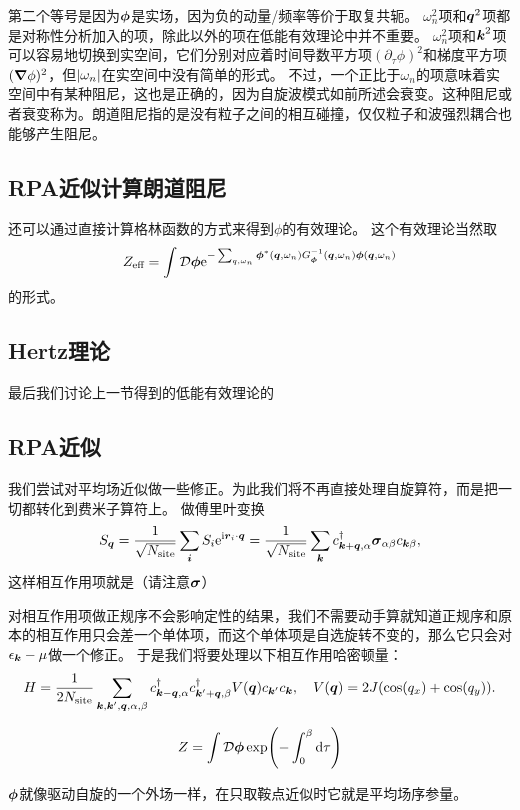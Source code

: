 第二个等号是因为$\vb*{\phi}$是实场，因为负的动量/频率等价于取复共轭。
$\omega_n^2$项和$\vb*{q}^2$项都是对称性分析加入的项，除此以外的项在低能有效理论中并不重要。%
$\omega_n^2$项和$\vb*{k}^2$项可以容易地切换到实空间，它们分别对应着时间导数平方项$(\partial_\tau \phi)^2$和梯度平方项$(\grad{\phi})^2$，但$\abs{\omega_n}$在实空间中没有简单的形式。
不过，一个正比于$\omega_n$的项意味着实空间中有某种阻尼，这也是正确的，因为自旋波模式如前所述会衰变。这种阻尼或者衰变称为。朗道阻尼指的是没有粒子之间的相互碰撞，仅仅粒子和波强烈耦合也能够产生阻尼。

\subsection{RPA近似计算朗道阻尼}

还可以通过直接计算格林函数的方式来得到$\phi$的有效理论。
这个有效理论当然取
\[
    Z_\text{eff} = \int \mathcal{D}\vb*{\phi} \mathrm{e}^{- \sum_{q, \omega_n} \vb*{\phi}^*(\vb*{q}, \omega_n) G^{-1}_{\vb*{\phi}}(\vb*{q}, \omega_n) \vb*{\phi}(\vb*{q}, \omega_n)}
\]
的形式。

\subsection{Hertz理论}

最后我们讨论上一节得到的低能有效理论的

\subsection{RPA近似}

我们尝试对平均场近似做一些修正。为此我们将不再直接处理自旋算符，而是把一切都转化到费米子算符上。
做傅里叶变换
\[
    {S}_{\vb*{q}} = \frac{1}{\sqrt{N_\text{site}}} \sum_{\vb*{i}} {S}_i \mathrm{e}^{\mathrm{i} \vb*{r}_i \cdot \vb*{q}} = \frac{1}{\sqrt{N_\text{site}}} \sum_{\vb*{k}} {c}^\dagger_{\vb*{k}+\vb*{q}, \alpha} \vb*{\sigma}_{\alpha \beta} {c}_{\vb*{k} \beta},
\]
这样相互作用项就是（请注意$\vb*{\sigma}$）

对相互作用项做正规序不会影响定性的结果，我们不需要动手算就知道正规序和原本的相互作用只会差一个单体项，而这个单体项是自选旋转不变的，那么它只会对$\epsilon_{\vb*{k}} - \mu$做一个修正。
于是我们将要处理以下相互作用哈密顿量：%
\begin{equation}
    {H} = \frac{1}{2 N_\text{site}} \sum_{\vb*{k}, \vb*{k}', \vb*{q}, \alpha, \beta} {c}^\dagger_{\vb*{k}-\vb*{q}, \alpha} {c}^\dagger_{\vb*{k}'+\vb*{q}, \beta} V(\vb*{q}) {c}_{\vb*{k}'} {c}_{\vb*{k}}, \quad V(\vb*{q}) = 2 J (\cos(q_x) + \cos(q_y)).
\end{equation}

\begin{equation}
    Z = \int \mathcal{D} \vb*{\phi} \exp(- \int_0^\beta \dd{\tau} )
\end{equation}

$\vb*{\phi}$就像驱动自旋的一个外场一样，在只取鞍点近似时它就是平均场序参量。